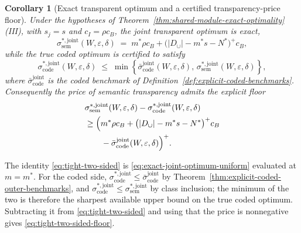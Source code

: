 \documentclass[journal]{IEEEtran}
\makeatletter
\newtheorem{corollary}{Corollary}[section]
\numberwithin{equation}{section}
\renewenvironment{proof}[1][\proofname]{\par
  \pushQED{\qed}%
  \normalfont \topsep6\p@\@plus6\p@\relax
  \trivlist
  \item[\hskip\labelsep
        \itshape
    #1\@addpunct{.}]\ignorespaces
}{%
  \popQED\endtrivlist\@endpefalse
}
\makeatother
\begin{document}
\begin{corollary}[Exact transparent optimum and a certified transparency-price floor]
\label{cor:tight-two-sided}
Under the hypotheses of
Theorem~\ref{thm:shared-module-exact-optimality}(III), with \(s_j=s\) and
\(c_I=\rho c_B\), the joint transparent optimum is exact,
\begin{equation}
  \sigma_{\mathrm{sem}}^{*,\mathrm{joint}}(W,\varepsilon,\delta)
  \;=\;
  m^*\rho c_B
  +
  \bigl(|D_{\cup}|-m^*s-N^*\bigr)^+c_B,
\label{eq:tight-two-sided}
\end{equation}
while the true coded optimum is certified to satisfy
\[
  \sigma_{\mathrm{code}}^{*,\mathrm{joint}}(W,\varepsilon,\delta)
  \;\le\;
  \min\left\{
    \bar\sigma_{\mathrm{code}}^{\mathrm{joint}}(W,\varepsilon,\delta),\,
    \sigma_{\mathrm{sem}}^{*,\mathrm{joint}}(W,\varepsilon,\delta)
  \right\},
\]
where \(\bar\sigma_{\mathrm{code}}^{\mathrm{joint}}\) is the coded
benchmark of Definition~\ref{def:explicit-coded-benchmarks}.
Consequently the price of semantic transparency admits the explicit floor
\begin{equation}
  \begin{split}
    & \sigma_{\mathrm{sem}}^{*,\mathrm{joint}}(W,\varepsilon,\delta)
     - \sigma_{\mathrm{code}}^{*,\mathrm{joint}}(W,\varepsilon,\delta) \\
    & \ge \Bigl( m^*\rho c_B
      + \bigl(|D_\cup|-m^*s-N^*\bigr)^+ c_B \\
    & \qquad - \bar\sigma_{\mathrm{code}}^{\mathrm{joint}}(W,\varepsilon,\delta) \Bigr)^+ .
  \end{split}
\label{eq:tight-two-sided-floor}
\end{equation}
\end{corollary}

\begin{proof}
The identity \eqref{eq:tight-two-sided} is
\eqref{eq:exact-joint-optimum-uniform} evaluated at \(m=m^*\).  For the
coded side,
\(\sigma_{\mathrm{code}}^{*,\mathrm{joint}}
\le\bar\sigma_{\mathrm{code}}^{\mathrm{joint}}\) by
Theorem~\ref{thm:explicit-coded-outer-benchmarks}, and
\(\sigma_{\mathrm{code}}^{*,\mathrm{joint}}
\le\sigma_{\mathrm{sem}}^{*,\mathrm{joint}}\) by class inclusion; the
minimum of the two is therefore the sharpest available upper bound on the
true coded optimum.  Subtracting it from \eqref{eq:tight-two-sided} and
using that the price is nonnegative gives
\eqref{eq:tight-two-sided-floor}.
\end{proof}
\end{document}
